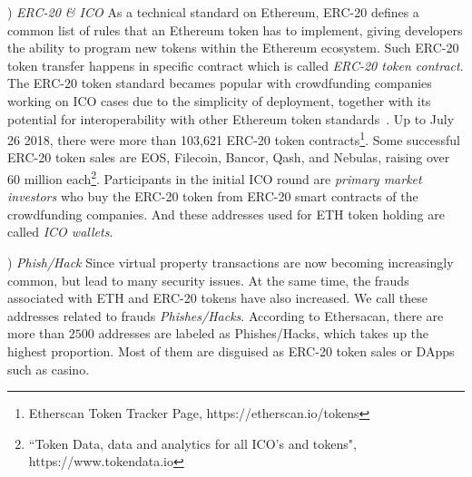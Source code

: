 





) \emph{ERC-20 \& ICO}
As a technical standard on Ethereum, ERC-20 defines a common list of rules that an Ethereum token has to implement, giving developers the ability to program new tokens within the Ethereum ecosystem. Such ERC-20 token transfer happens in specific contract which is called \emph{ERC-20 token contract}. The ERC-20 token standard becames popular with crowdfunding companies working on ICO cases due to the simplicity of deployment, together with its potential for interoperability with other Ethereum token standards~\cite{erc-20}. Up to July 26 2018, there were more than 103,621 ERC-20 token contracts\footnote{Etherscan Token Tracker Page, https://etherscan.io/tokens}. Some successful ERC-20 token sales are EOS, Filecoin, Bancor, Qash, and Nebulas, raising over 60 million each\footnote{``Token Data, data and analytics for all ICO's and tokens", https://www.tokendata.io}. Participants in the initial ICO round are \emph{primary market investors} who buy the ERC-20 token from ERC-20 smart contracts of the crowdfunding companies. And these addresses used for ETH token holding are called \emph{ICO wallets}.

) \emph{Phish/Hack}
Since virtual property transactions are now becoming increasingly common, but lead to many security issues. At the same time, the frauds associated with ETH and ERC-20 tokens have also increased. We call these addresses related to frauds \emph{Phishes/Hacks}. According to Ethersacan, there are more than $2500$ addresses are labeled as Phishes/Hacks, which takes up the highest proportion. Most of them are disguised as ERC-20 token sales or DApps such as casino. 

